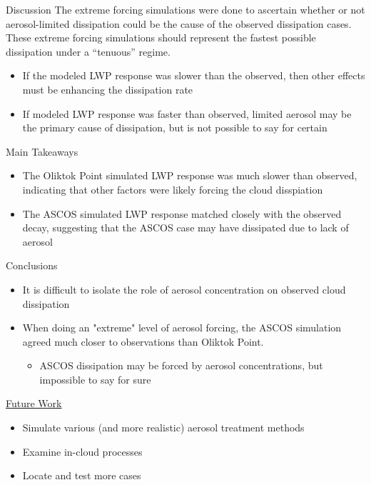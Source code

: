\documentclass[final]{beamer}
\newlength{\onecolwid}
\begin{document}
\begin{frame}[t]
\begin{columns}[t]
\begin{column}{\onecolwid}
	\begin{block}{Discussion}
		The extreme forcing simulations were done to ascertain whether or not aerosol-limited dissipation could be the cause of the observed dissipation cases. These extreme forcing simulations should represent the fastest possible dissipation under a ``tenuous'' regime.

		\begin{itemize}
			\item If the modeled LWP response was slower than the observed, then other effects must be enhancing the dissipation rate
			\item If modeled LWP response was faster than observed, limited aerosol may be the primary cause of dissipation, but is not possible to say for certain
		\end{itemize}
		
	\end{block}
	\begin{alertblock}{Main Takeaways}
		\begin{itemize}
			\item The Oliktok Point simulated LWP response was much slower than observed, indicating that other factors were likely forcing the cloud disspiation	
			\item The ASCOS simulated LWP response matched closely with the observed decay, suggesting that the ASCOS case may have dissipated due to lack of aerosol
		\end{itemize}
	\end{alertblock}
	
	\begin{block}{Conclusions}
		\begin{itemize}
			\item It is difficult to isolate the role of aerosol concentration on observed cloud dissipation
			\item When doing an "extreme" level of aerosol forcing, the ASCOS simulation agreed much closer to observations than Oliktok Point.
			\begin{itemize}
				\item ASCOS dissipation may be forced by aerosol concentrations, but impossible to say for sure
			\end{itemize}
		\end{itemize}
		
		\underline{Future Work}
		\begin{itemize}
			\item Simulate various (and more realistic) aerosol treatment methods
			\item Examine in-cloud processes
			\item Locate and test more cases
		\end{itemize}
		

\end{block}
\end{column}
\end{columns}
\end{frame}
\end{document}
